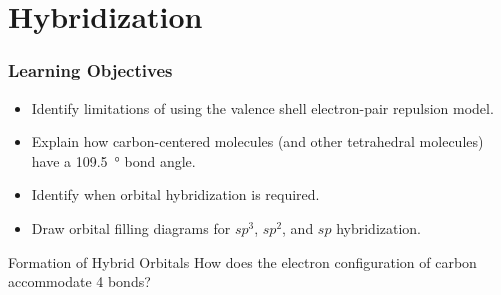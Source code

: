 \documentclass[notes=only]{beamer}
\begin{document}

\section{Hybridization}

\begin{frame}
	\frametitle{Learning Objectives}
	\begin{itemize}
		\item Identify limitations of using the valence shell electron-pair
			repulsion model.
		\item Explain how carbon-centered molecules (and other tetrahedral
			molecules) have a \SI{109.5}{\degree} bond angle.
		\item Identify when orbital hybridization is required.
		\item Draw orbital filling diagrams for $sp^3$, $sp^2$, and $sp$
			hybridization.
	\end{itemize}
\end{frame}

\begin{frame}[t]{Formation of Hybrid Orbitals}
%
	How does the electron configuration of carbon accommodate 4 bonds?
\end{frame}
\end{document}
